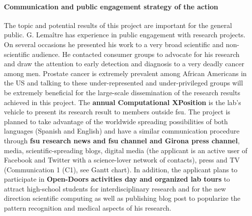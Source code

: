 \paragraph{Communication and public engagement strategy of the action}
The topic and potential results of this project are important for the general public.
G. Lema\^itre has experience in public engagement with research projects.
On several occasions he presented his work to a very broad scientific and non-scientific audience.
He contacted consumer groups to advocate for his research and draw the attention to early detection and diagnosis to a very deadly cancer among men.
Prostate cancer is extremely prevalent among African Americans in the US and talking to these under-represented and under-privileged groups will be extremely beneficial for the large-scale dissemination of the research results achieved in this project.
The \textbf{annual Computational XPosition} is the lab's vehicle to present its research result to members outside \ac{fsu}.
The project is planned to take advantage of the worldwide spreading possibilities of both languages (Spanish and English) and have a similar communication procedure through \textbf{\ac{fsu} research news and \ac{fsu} channel and Girona press channel}, media, scientific-spreading blogs, digital media (the applicant is an active user of Facebook and Twitter with a science-lover network of contacts), press and TV (Communication 1 (C1), see Gantt chart).
In addition, the applicant plans to participate in \textbf{Open-Doors activities day and organized lab tours} to attract high-school students for interdisciplinary research and for the new direction scientific computing as well as publishing blog post to popularize the pattern recognition and medical aspects of his research.
